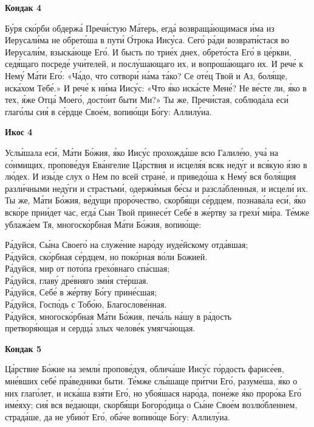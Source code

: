 \documentclass[14pt,article,oneside]{memoir}
\begin{document}
\begin{center}
  \textbf{Кондак 4}
\end{center}

Бу́ря ско́рби обдержа́ Пречи́стую Ма́терь, егда́ возвраща́ющимася и́ма из Иерусали́ма не обрето́ша в пути́ О́трока Иису́са. Сего́ ра́ди возврати́стася во Иерусали́м, взыска́юще Его́. И бысть по трие́х днех, обрето́ста Его́ в це́ркви, седя́щаго посреде́ учи́телей, и послу́шающаго их, и вопроша́ющаго их. И рече́ к Нему́ Ма́ти Его́: «Ча́до, что сотвори́ на́ма та́ко? Се оте́ц Твой и Аз, боля́ще, иска́хом Тебе́.» И рече́ к ни́ма Иису́с: «Что я́ко иска́сте Мене́? Не ве́сте ли, я́ко в тех, я́же Отца́ Моего́, досто́ит быти Ми?» Ты же, Пречи́стая, соблюда́ла еси́ глаго́лы сия́ в се́рдце Свое́м, вопию́щи Бо́гу: Аллилу́иа.

\begin{center}
  \textbf{Икос 4}
\end{center}

Услы́шала еси́, Ма́ти Бо́жия, я́ко Иису́с прохожда́ше всю Галиле́ю, уча́ на со́нмищих, пропове́дуя Ева́нгелие Ца́рствия и исцеля́я всяк неду́г и вся́кую я́зю в лю́дех. И изы́де слух о Нем по всей стране́, и приведо́ша к Нему́ вся боля́щия разли́чными неду́ги и страстьми́, одержи́мыя бе́сы и разсла́бленныя, и исцели́ их. Ты же, Ма́ти Бо́жия, ве́дущи проро́чество, скорбя́щи се́рдцем, познава́ла еси́, я́ко вско́ре прии́дет час, егда́ Сын Твой принесе́т Себе́ в же́ртву за грехи́ ми́ра. Те́мже ублажа́ем Тя, многоско́рбная Ма́ти Бо́жия, вопию́ще:

\noindent Ра́дуйся, Сы́на Своего́ на служе́ние наро́ду иуде́йскому отда́вшая;\\ Ра́дуйся, ско́рбная се́рдцем, но поко́рная во́ли Божией.\\
Ра́дуйся, мир от пото́па грехо́внаго спа́сшая;\\ Ра́дуйся, главу́ дре́вняго зми́я сте́ршая.\\
Ра́дуйся, Себе́ в же́ртву Бо́гу прине́сшая;\\ Ра́дуйся, Госпо́дь с Тобо́ю, Благослове́нная.\\
Ра́дуйся, многоско́рбная Ма́ти Бо́жия, печа́ль на́шу в ра́дость\\ \vin претворя́ющая и сердца́ злых челове́к умягча́ющая.

\begin{center}
  \textbf{Кондак 5}
\end{center}

Ца́рствие Бо́жие на земли́ пропове́дуя, облича́ше Иису́с го́рдость фарисе́ев, мне́вших себе́ пра́ведники быти. Те́мже слы́шаще при́тчи Его́, разуме́ша, я́ко о них глаго́лет, и иска́ша взя́ти Его́, но убоя́шася наро́да, поне́же я́ко проро́ка Его́ име́яху; сия́ вся ве́дающи, скорбя́щи Богоро́дица о Сы́не Свое́м возлю́бленнем, страда́ше, да не убию́т Его́, оба́че вопию́ще Бо́гу: Аллилу́иа.
\end{document}
